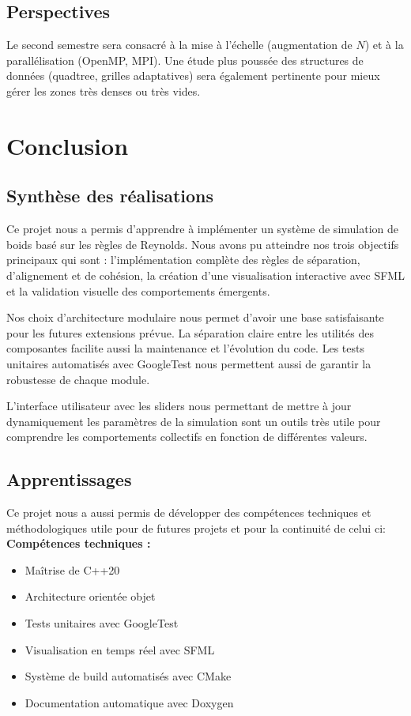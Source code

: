 \documentclass[11pt,a4paper]{article}
\begin{document}
\subsection{Perspectives}
Le second semestre sera consacré à la mise à l'échelle (augmentation de $N$) et à la parallélisation (OpenMP, MPI). Une étude plus poussée des structures de données (quadtree, grilles adaptatives) sera également pertinente pour mieux gérer les zones très denses ou très vides.

\section{Conclusion}

\subsection{Synthèse des réalisations}

Ce projet nous a permis d'apprendre à implémenter un système de simulation de boids basé sur les règles de Reynolds. Nous avons pu atteindre nos trois objectifs principaux qui sont : l'implémentation complète des règles de séparation, d'alignement et de cohésion, la création d'une visualisation interactive avec SFML et la validation visuelle des comportements émergents.

Nos choix d'architecture modulaire nous permet d'avoir une base satisfaisante pour les futures extensions prévue. La séparation claire entre les utilités des composantes facilite aussi la maintenance et l'évolution du code. Les tests unitaires automatisés avec GoogleTest nous permettent aussi de garantir la robustesse de chaque module.

L'interface utilisateur avec les sliders nous permettant de mettre à jour dynamiquement les paramètres de la simulation sont un outils très utile pour comprendre les comportements collectifs en fonction de différentes valeurs.

\subsection{Apprentissages}

Ce projet nous a aussi permis de développer des compétences techniques et méthodologiques utile pour de futures projets et pour la continuité de celui ci:
\textbf{Compétences techniques :}
\begin{itemize}
    \item Maîtrise de C++20
    \item Architecture orientée objet
    \item Tests unitaires avec GoogleTest
    \item Visualisation en temps réel avec SFML
    \item Système de build automatisés avec CMake
    \item Documentation automatique avec Doxygen
\end{itemize}
\end{document}
